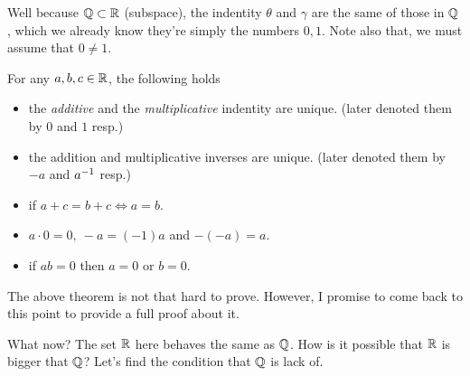 Well because $\mathbb{Q}\subset\mathbb{R}$ (subspace), the indentity $\theta$ 
and $\gamma$ are the same of those in $\mathbb{Q}$, which we already
know they're simply the numbers $0,1$. 
Note also that, we must assume that $0\neq 1$.
\begin{theorem}
  For any $a,b,c\in\mathbb{R}$, the following holds
  \begin{itemize}
    \item the \emph{additive} and the \emph{multiplicative} 
      indentity are unique. 
      (later denoted them by $0$ and $1$ resp.)
    \item the addition and multiplicative inverses are
      unique. (later denoted them by $-a$ and $a^{-1}$ resp.)
    \item if $a+c=b+c\iff a=b$.
    \item $a\cdot 0=0,~-a=(-1)a$ and $-(-a)=a$.
    \item if $ab=0$ then $a=0$ or $b=0$.
  \end{itemize}
\end{theorem}
The above theorem is not that hard to prove. However, I promise 
to come back to this point to provide a full proof about it.

What now? The set $\mathbb{R}$ here behaves the same as $\mathbb{Q}$. 
How is it possible that $\mathbb{R}$ is bigger that $\mathbb{Q}$?
Let's find the condition that $\mathbb{Q}$ is lack of.

